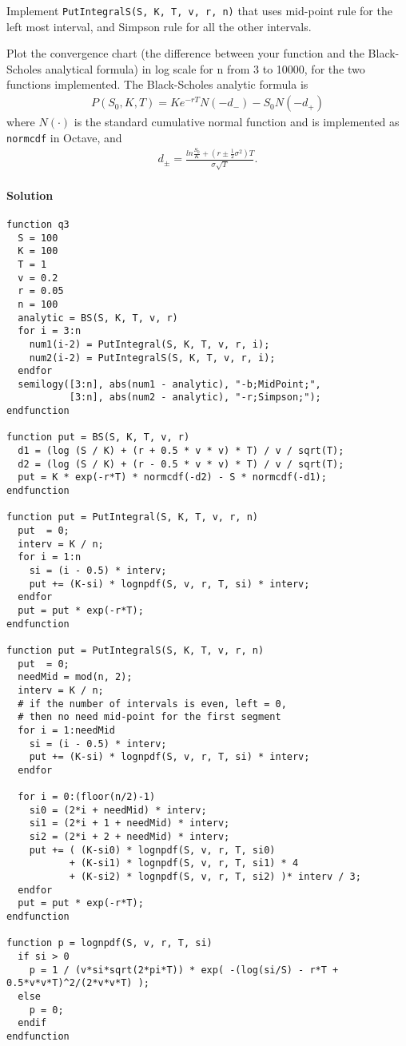 \documentclass[12pt,a4paper,hidelinks,fleqn]{article}            %
\begin{document}
Implement \verb=PutIntegralS(S, K, T, v, r, n)= that uses mid-point rule for the left most interval, and Simpson rule for all the other intervals.

Plot the convergence chart (the difference between your function and the Black-Scholes analytical formula) in log scale for n from 3 to 10000, for the two functions implemented.
The Black-Scholes analytic formula is
\begin{align*}
P(S_0, K, T) = Ke^{-rT} N(-d_-) - S_0 N(-d_+)
\end{align*}
where $N(\cdot)$ is the standard cumulative normal function and is implemented as \verb=normcdf= in Octave, and
\begin{align*}
d_{\pm} = \frac{ln\frac{S_0}{K} + (r \pm \frac{1}{2}\sigma^2)T}{\sigma\sqrt{T}}.
\end{align*}

\paragraph{Solution}
\begin{verbatim}
function q3
  S = 100
  K = 100
  T = 1
  v = 0.2
  r = 0.05
  n = 100
  analytic = BS(S, K, T, v, r)
  for i = 3:n
    num1(i-2) = PutIntegral(S, K, T, v, r, i);
    num2(i-2) = PutIntegralS(S, K, T, v, r, i);
  endfor
  semilogy([3:n], abs(num1 - analytic), "-b;MidPoint;", 
           [3:n], abs(num2 - analytic), "-r;Simpson;");
endfunction

function put = BS(S, K, T, v, r)
  d1 = (log (S / K) + (r + 0.5 * v * v) * T) / v / sqrt(T);
  d2 = (log (S / K) + (r - 0.5 * v * v) * T) / v / sqrt(T);
  put = K * exp(-r*T) * normcdf(-d2) - S * normcdf(-d1);
endfunction

function put = PutIntegral(S, K, T, v, r, n)
  put  = 0;
  interv = K / n;
  for i = 1:n
    si = (i - 0.5) * interv;
    put += (K-si) * lognpdf(S, v, r, T, si) * interv;
  endfor
  put = put * exp(-r*T);
endfunction

function put = PutIntegralS(S, K, T, v, r, n)
  put  = 0;
  needMid = mod(n, 2); 
  interv = K / n;
  # if the number of intervals is even, left = 0, 
  # then no need mid-point for the first segment
  for i = 1:needMid
    si = (i - 0.5) * interv;
    put += (K-si) * lognpdf(S, v, r, T, si) * interv;
  endfor

  for i = 0:(floor(n/2)-1)
    si0 = (2*i + needMid) * interv;
    si1 = (2*i + 1 + needMid) * interv;
    si2 = (2*i + 2 + needMid) * interv;
    put += ( (K-si0) * lognpdf(S, v, r, T, si0) 
           + (K-si1) * lognpdf(S, v, r, T, si1) * 4
           + (K-si2) * lognpdf(S, v, r, T, si2) )* interv / 3;
  endfor
  put = put * exp(-r*T);
endfunction

function p = lognpdf(S, v, r, T, si)
  if si > 0 
    p = 1 / (v*si*sqrt(2*pi*T)) * exp( -(log(si/S) - r*T + 0.5*v*v*T)^2/(2*v*v*T) );
  else 
    p = 0;
  endif
endfunction
\end{verbatim}
\end{document}
